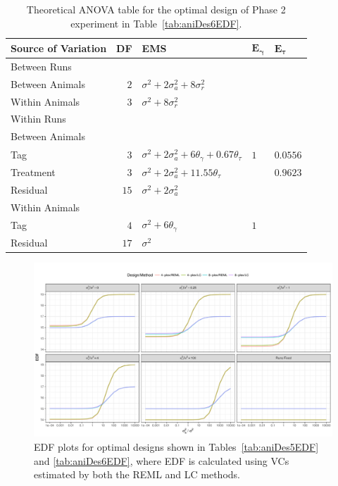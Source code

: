 \begin{table}[!ht]
 \caption{Theoretical ANOVA table for the optimal design of Phase 2 experiment in Table~\ref{tab:aniDes6EDF}.}
 \begin{tabular}[t]{lrlll} 
 \toprule 
 \multicolumn{1}{l}{\textbf{Source of Variation}} & \multicolumn{1}{l}{\textbf{DF}} & \multicolumn{1}{l}{\textbf{EMS}}& \multicolumn{1}{l}{$\bm{E_{\gamma}}$}&\multicolumn{1}{l}{$\bm{E_{\tau}}$}\\ 
 \midrule 
 Between Runs &  &  & & \\ 
 \quad Between Animals & $2$ & $\sigma^2+2\sigma_{a}^2+8\sigma_{r}^2$ & & \\  \quad Within Animals & $3$ & $\sigma^2+8\sigma_{r}^2$ & & \\ \hline 
 Within Runs &  &  & & \\ 
 \quad Between Animals &  &  & & \\ 
 \quad \quad Tag & $3$ & $\sigma^2+2\sigma_{a}^2+6\theta_{\gamma}+ 0.67\theta_{\tau}$ &$1$ & $0.0556$\\ 
 \quad \quad Treatment & $3$ & $\sigma^2+2\sigma_{a}^2+11.55\theta_{\tau}$ & & $0.9623$\\ 
 \quad \quad Residual & $15$ & $\sigma^2+2\sigma_{a}^2$ & & \\ \hline 
 \quad Within Animals &  &  & & \\ 
 \quad \quad Tag & $4$ & $\sigma^2+6\theta_{\gamma}$ &$1$ & \\ 
 \quad \quad Residual & $17$ & $\sigma^2$ & & \\ 
 \bottomrule 
 \end{tabular} 
 \label{tab:ANOVAPhase1CRD22} 
\end{table} 

\begin{figure}[!h]
\centering
\includegraphics[width=1 \textwidth]{Chapter5/Graph/CRD462.pdf}
\caption{EDF plots for optimal designs shown in Tables~\ref{tab:aniDes5EDF} and \ref{tab:aniDes6EDF}, where EDF is calculated using VCs estimated by both the REML and LC methods.}
\label{fig:compare44CRD}
\end{figure}

